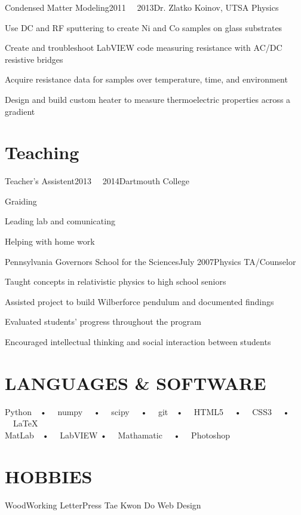 \documentclass[12pt,a4paper]{resume}
\begin{document}
\begin{work}{Condensed Matter Modeling}{2011  \textemdash \ \ 2013}{Dr. Zlatko Koinov, UTSA Physics}
\item{Use DC and RF sputtering to create Ni and Co samples on glass substrates}
\item{Create and troubleshoot LabVIEW code measuring resistance with AC/DC resistive bridges}
\item{ Acquire resistance data for samples over temperature, time, and environment}
\item{Design and build custom heater to measure thermoelectric properties across a gradient}
\end{work}

\section*{Teaching}
\begin{work}{Teacher's Assistent}{2013  \textemdash \ \ 2014}{Dartmouth College}
\item{Graiding}
\item{Leading lab and comunicating}
\item{Helping with home work}
\end{work}

\begin{work}{Pennsylvania Governors School for the Sciences}{July 2007}{Physics TA/Counselor}
\item{Taught concepts in relativistic physics to high school seniors}
\item{Assisted project to build Wilberforce pendulum and documented findings}
\item{Evaluated students’ progress throughout the program}
\item{Encouraged intellectual thinking and social interaction between students}
\end{work}


\section{LANGUAGES \& SOFTWARE}
\WorkFont \small Python\ \ • \ \ numpy \ \ • \ \ scipy  \ \ • \ \ git\ \ • \ \   HTML5 \ \ • \ \ CSS3 \ \ • \ \ \LaTeX \ \ %
\\ MatLab\ \ • \ \ LabVIEW  • \ \ Mathamatic   \ \ • \ \  Photoshop


\section{HOBBIES}
WoodWorking  \hfill{} LetterPress \hfill{} Tae Kwon Do \hfill Web Design
\end{document}
